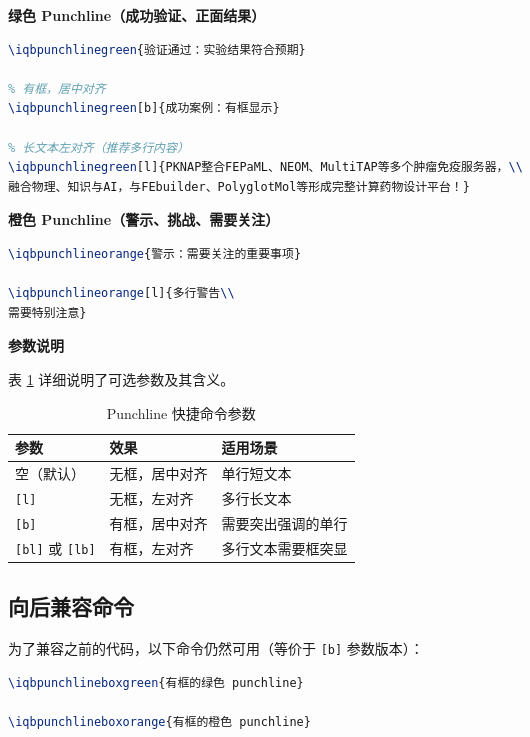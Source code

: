 \textbf{绿色 Punchline（成功验证、正面结果）}

\begin{lstlisting}[style=blockstyle,language=TeX]
% 默认：无框，居中对齐
\iqbpunchlinegreen{验证通过：实验结果符合预期}

% 有框，居中对齐
\iqbpunchlinegreen[b]{成功案例：有框显示}

% 长文本左对齐（推荐多行内容）
\iqbpunchlinegreen[l]{PKNAP整合FEPaML、NEOM、MultiTAP等多个肿瘤免疫服务器，\\
融合物理、知识与AI，与FEbuilder、PolyglotMol等形成完整计算药物设计平台！}
\end{lstlisting}

\textbf{橙色 Punchline（警示、挑战、需要关注）}

\begin{lstlisting}[style=blockstyle,language=TeX]
\iqbpunchlineorange{警示：需要关注的重要事项}

\iqbpunchlineorange[l]{多行警告\\
需要特别注意}
\end{lstlisting}

\textbf{参数说明}

表 \ref{tab:punchline-params} 详细说明了可选参数及其含义。

\begin{table}[!h]
\centering
\caption{Punchline 快捷命令参数}
\label{tab:punchline-params}
\begin{tabular}{p{2cm}p{3cm}p{7cm}}
\toprule
\textbf{参数} & \textbf{效果} & \textbf{适用场景} \\
\midrule
空（默认） & 无框，居中对齐 & 单行短文本 \\
\lstinline|[l]| & 无框，左对齐 & 多行长文本 \\
\lstinline|[b]| & 有框，居中对齐 & 需要突出强调的单行 \\
\lstinline|[bl]| 或 \lstinline|[lb]| & 有框，左对齐 & 多行文本需要框突显 \\
\bottomrule
\end{tabular}
\end{table}

\subsection{向后兼容命令}

为了兼容之前的代码，以下命令仍然可用（等价于 \lstinline|[b]| 参数版本）：

\begin{lstlisting}[style=blockstyle,language=TeX]
\iqbpunchlineboxgreen{有框的绿色 punchline}

\iqbpunchlineboxorange{有框的橙色 punchline}
\end{lstlisting}
